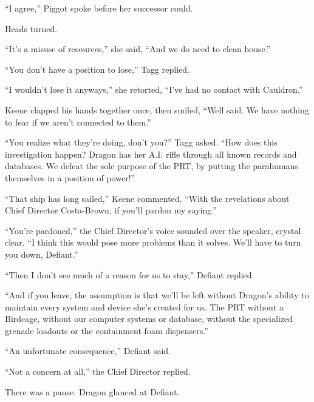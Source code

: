 ``I agree,'' Piggot spoke before her successor could.



Heads turned.



``It's a misuse of resources,'' she said, ``And we do need to clean house.''



``You don't have a position to lose,'' Tagg replied.



``I wouldn't lose it anyways,'' she retorted, ``I've had no contact with Cauldron.''



Keene clapped his hands together once, then smiled, ``Well said.  We have nothing to fear if we aren't connected to them.''



``You realize what they're doing, don't you?'' Tagg asked.  ``How does this investigation happen?  Dragon has her A.I. rifle through all known records and databases.  We defeat the sole purpose of the PRT, by putting the parahumans themselves in a position of power!''



``That ship has long sailed,'' Keene commented, ``With the revelations about Chief Director Costa-Brown, if you'll pardon my saying.''



``You're pardoned,'' the Chief Director's voice sounded over the speaker, crystal clear.  ``I think this would pose more problems than it solves.  We'll have to turn you down, Defiant.''



``Then I don't see much of a reason for us to stay,'' Defiant replied.



``And if you leave, the assumption is that we'll be left without Dragon's ability to maintain every system and device she's created for us.  The PRT without a Birdcage, without our computer systems or database, without the specialized grenade loadouts or the containment foam dispensers.''



``An unfortunate consequence,'' Defiant said.



``Not a concern at all,'' the Chief Director replied.



There was a pause.  Dragon glanced at Defiant.



